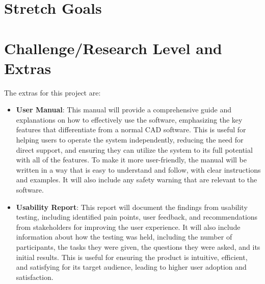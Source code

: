 \documentclass{article}
\begin{document}
\section{Stretch Goals}

\section{Challenge/Research Level and Extras}

%
%
The extras for this project are:

\begin{itemize}
    \item \textbf{User Manual}: This manual will provide a comprehensive guide and explanations on how to effectively use the software, emphasizing the key features that differentiate from a normal CAD software. This is useful for helping users to operate the system independently, reducing the need for direct support, and ensuring they can utilize the system to its full potential with all of the features. To make it more user-friendly, the manual will be written in a way that is easy to understand and follow, with clear instructions and examples. It will also include any safety warning that are relevant to the software.
    \item \textbf{Usability Report}: This report will document the findings from usability testing, including identified pain points, user feedback, and recommendations from stakeholders for improving the user experience. It will also include information about how the testing was held, including the number of participants, the tasks they were given, the questions they were asked, and its initial results. This is useful for ensuring the product is intuitive, efficient, and satisfying for its target audience, leading to higher user adoption and satisfaction.
\end{itemize}
\newpage{}
\end{document}
